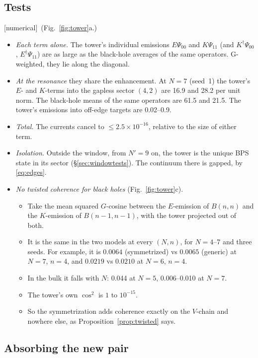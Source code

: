 \documentclass[11pt]{article}
\newcommand{\Np}{N'}
\newcommand{\tagbox}[2]{\textsf{\small\color{#1}[#2]}}
\newcommand{\NUM}{\tagbox{cnum}{numerical}}
\theoremstyle{plain}
\theoremstyle{remark}
\numberwithin{equation}{section}
\begin{document}
\subsection{Tests}

\NUM\ (Fig.~\ref{fig:tower}a.)
\begin{itemize}\itemsep1pt
\item \emph{Each term alone.} The tower's individual emissions $E\Psi_{00}$ and $K\Psi_{11}$ (and $K^\dagger\Psi_{00}$,
  $E^\dagger\Psi_{11}$) are as large as the black-hole averages of the same operators. G-weighted, they lie along the
  diagonal.
\item \emph{At the resonance} they share the enhancement. At $N=7$ (seed~1) the tower's $E$- and $K$-terms into the
  gapless sector $(4,2)$ are 16.9 and 28.2 per unit norm. The black-hole means of the same operators are 61.5 and 21.5.
  The tower's emissions into off-edge targets are 0.02--0.9.
\item \emph{Total.} The currents cancel to $\le2.5\times10^{-16}$, relative to the size of either term.
\item \emph{Isolation.} Outside the window, from $\Np=9$ on, the tower is the unique BPS state in its sector
  (\S\ref{sec:windowtests}). The continuum there is gapped, by \eqref{eq:edges}.
\item \emph{No twisted coherence for black holes} (Fig.~\ref{fig:tower}c).
  \begin{itemize}\itemsep1pt
  \item Take the mean squared $G$-cosine between the $E$-emission of $B(n,n)$ and the $K$-emission of $B(n-1,n-1)$, with
    the tower projected out of both.
  \item It is the same in the two models at every $(N,n)$, for $N=4$--7 and three seeds. For example, it is $0.0064$
    (symmetrized) vs $0.0065$ (generic) at $N=7$, $n=4$, and $0.0219$ vs $0.0210$ at $N=6$, $n=4$.
  \item In the bulk it falls with $N$: 0.044 at $N=5$, 0.006--0.010 at $N=7$.
  \item The tower's own $\cos^2$ is $1$ to $10^{-15}$.
  \item So the symmetrization adds coherence exactly on the $V$-chain and nowhere else, as
    Proposition~\ref{prop:twisted} says.
  \end{itemize}
\end{itemize}

\subsection{Absorbing the new pair}\label{sec:pairing}
\end{document}
